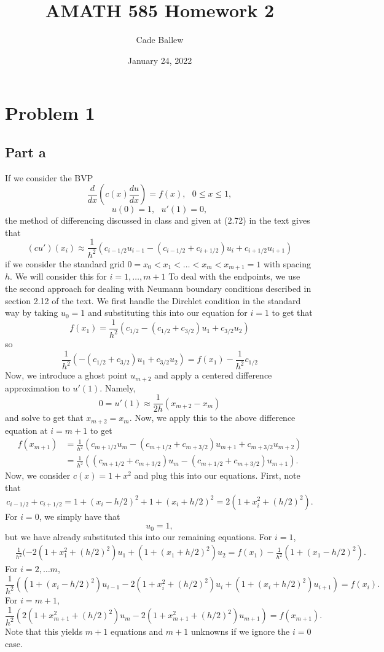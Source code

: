 \documentclass{article}
\title{AMATH 585 Homework 2}
\author{Cade Ballew}
\date{January 24, 2022}
\begin{document}
\maketitle

\section{Problem 1}
\subsection{Part a}
If we consider the BVP
\[
\frac{d}{dx} \left( c(x) \frac{du}{dx} \right) = f(x) ,~~~
0 \leq x \leq 1 ,
\]
\[
u(0) = 1,~~~u'(1) = 0,
\]
the method of differencing discussed in class and given at (2.72) in the text gives that
\[
(cu')(x_i)\approx\frac{1}{h^2}(c_{i-1/2}u_{i-1}-(c_{i-1/2}+c_{i+1/2})u_i+c_{i+1/2}u_{i+1})
\]
if we consider the standard grid $0=x_0<x_1<\ldots<x_m<x_{m+1}=1$ with spacing $h$. We will consider this for $i=1,\ldots, m+1$ To deal with the endpoints, we use the second approach for dealing with Neumann boundary conditions described in section 2.12 of the text. We first handle the Dirchlet condition in the standard way by taking $u_0=1$ and substituting this into our equation for $i=1$ to get that 
\[
f(x_1)=\frac{1}{h^2}(c_{1/2}-(c_{1/2}+c_{3/2})u_1+c_{3/2}u_{2})
\]
so 
\[
\frac{1}{h^2}(-(c_{1/2}+c_{3/2})u_1+c_{3/2}u_{2})=f(x_1)-\frac{1}{h^2}c_{1/2}
\]
Now, we introduce a ghost point $u_{m+2}$ and apply a centered difference approximation to $u'(1)$. Namely,
\[
0=u'(1)\approx\frac{1}{2h}(x_{m+2}-x_m)
\]
and solve to get that $x_{m+2}=x_m$. Now, we apply this to the above difference equation at $i=m+1$ to get 
\begin{align*}
f(x_{m+1})&=\frac{1}{h^2}(c_{m+1/2}u_{m}-(c_{m+1/2}+c_{m+3/2})u_{m+1}+c_{m+3/2}u_{m+2})\\&=\frac{1}{h^2}((c_{m+1/2}+c_{m+3/2})u_{m}-(c_{m+1/2}+c_{m+3/2})u_{m+1}).
\end{align*}
Now, we consider $c(x)=1+x^2$ and plug this into our equations. First, note that 
\[
c_{i-1/2}+c_{i+1/2}=1+(x_i-h/2)^2+1+(x_i+h/2)^2=2(1+x_i^2+(h/2)^2).
\]
For $i=0$, we simply have that 
\[
u_0=1,
\]
but we have already substituted this into our remaining equations. For $i=1$, 
\begin{align*}
&\frac{1}{h^2}(-2(1+x_1^2+(h/2)^2)u_1+(1+(x_1+h/2)^2)u_{2}=f(x_1)-\frac{1}{h^2}(1+(x_1-h/2)^2).
\end{align*}
For $i=2,\ldots m$,
\[
\frac{1}{h^2}((1+(x_i-h/2)^2)u_{i-1}-2(1+x_i^2+(h/2)^2)u_i+(1+(x_i+h/2)^2)u_{i+1})=f(x_i).
\]
For $i=m+1$,
\[
\frac{1}{h^2}(2(1+x_{m+1}^2+(h/2)^2)u_{m}-2(1+x_{m+1}^2+(h/2)^2)u_{m+1})=f(x_{m+1}).
\]
Note that this yields $m+1$ equations and $m+1$ unknowns if we ignore the $i=0$ case.
\end{document}
